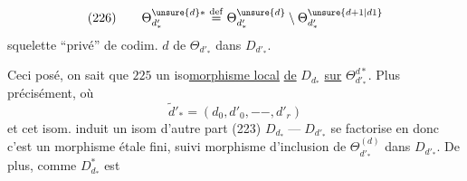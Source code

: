 
\[
(226)\qquad
\Theta_{d'_*}^{\unsure{d}*}\overset{\mathrm{def}}=
\Theta_{d'_*}^{\unsure{d}}\setminus
\Theta_{d'_*}^{\unsure{d+1|d1}}
\]
squelette ``privé'' de codim. $d$ de
$\Theta_{d'_*}$ dans $D_{d'_*}$.

Ceci posé, on sait que $225$ 
un  iso\uline{morphisme local}
\uline{de} $D_{d_*}$ \uline{sur}
$\Theta_{d'_*}^{d*}$. Plus
précisément, 
où 
\[
\widetilde d'_*=(d_0,d'_0,-\!-,d'_r)
\]
et cet isom. induit un isom
d'autre part (223)
$D_{d_*}\mathrel{\text{---}}D_{d'_*}$ se
factorise en
donc c'est un morphisme étale fini,
suivi   morphisme d'inclusion de
$\Theta_{d'_*}^{(d)}$ dans $D_{d'_*}$. De plus, comme $D_{d_*}^{*}$ est
\margin{136}


